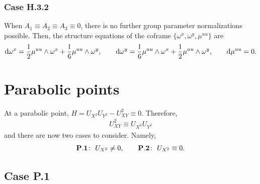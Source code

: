 \documentclass[pdftex]{sigma}%
\numberwithin{equation}{section}
\begin{document}
\subsubsection{Case H.3.2}

When $A_1\equiv A_2 \equiv A_3 \equiv 0$, there is no further group parameter normalizations possible. Then, the structure equations of the coframe $\{\omega^x,\omega^y,\mu^{uu}\}$ are
%
\begin{gather}\label{eq:H.3.2 structure}
{\rm d}\omega^x = \frac{1}{2} \mu^{uu}\wedge \omega^x + \frac{1}{6} \mu^{uu}\wedge \omega^y,\qquad
%
{\rm d}\omega^y = \frac{1}{6} \mu^{uu}\wedge \omega^x + \frac{1}{2} \mu^{uu}\wedge \omega^y,\qquad {\rm d}\mu^{uu}=0.
\end{gather}

\section{Parabolic points}\label{sec: parabolic}

At a parabolic point, $H = U_{X^2}U_{Y^2} - U_{XY}^2 \equiv 0$. Therefore,
\begin{gather}\label{eq:H=0}
U_{XY}^2 \equiv U_{X^2}U_{Y^2}
\end{gather}
and there are now two cases to consider. Namely,
\begin{gather*}
{\bf P.1}\colon\ U_{X^2}\neq 0,\qquad
{\bf P.2}\colon\ U_{X^2}\equiv 0.
\end{gather*}

\subsection{Case P.1}
\end{document}
